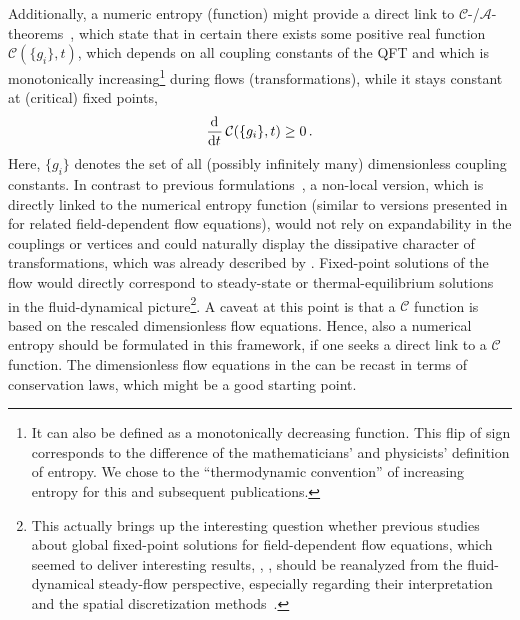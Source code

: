 Additionally, a numeric entropy (function) might provide a direct link to $\mathcal{C}$-/$\mathcal{A}$-theorems~\cite{Zamolodchikov:1986gt,Banks:1987qs,Cardy:1988cwa,Osborn:1989td,Jack:1990eb,Komargodski:2011vj,Curtright:2011qg,Rosten:2010vm}, which state that in certain \qfts{} there exists some positive real function $\mathcal{C} ( \{ g_i \} , t )$, which depends on all coupling constants of the QFT and which is monotonically increasing\footnote{%
	It can also be defined as a monotonically decreasing function.
	This flip of sign corresponds to the difference of the mathematicians' and physicists' definition of entropy.
	We chose to the ``thermodynamic convention'' of increasing entropy for this and subsequent publications.
} during \rg{} flows (transformations), while it stays constant at (critical) fixed points,
	\begin{align}
		\dod{}{t} \mathcal{C} ( \{ g_i \} , t ) \geq 0 \, .
	\end{align}
Here, $\{ g_i \}$ denotes the set of all (possibly infinitely many) dimensionless coupling constants.
In contrast to previous formulations~\cite{Haagensen:1993by,Generowicz:1997he,Forte:1998dx,Codello:2013iqa,Codello:2015ana,Becker:2014pea,Becker:2016zcn}, a non-local version, which is directly linked to the numerical entropy function (similar to versions presented in  for related field-dependent flow equations), would not rely on expandability in the couplings or vertices and could naturally display the dissipative character of \rg{} transformations, which was already described by .
Fixed-point solutions of the \frg{} flow would directly correspond to steady-state or thermal-equilibrium solutions~\cite{LeVeque:1992} in the fluid-dynamical picture\footnote{%
	This actually brings up the interesting question whether previous studies about global fixed-point solutions for field-dependent flow equations, which seemed to deliver interesting results, \eg{}, , should be reanalyzed from the fluid-dynamical steady-flow perspective, especially regarding their interpretation and the spatial discretization methods~\cite{LeVeque:1992}.
}.
A caveat at this point is that a $\mathcal{C}$ function is based on the rescaled dimensionless \rg{} flow equations.
Hence, also a numerical entropy should be formulated in this framework, if one seeks a direct link to a $\mathcal{C}$ function.
The dimensionless flow equations in the \lpa{} can be recast in terms of conservation laws, which might be a good starting point.

